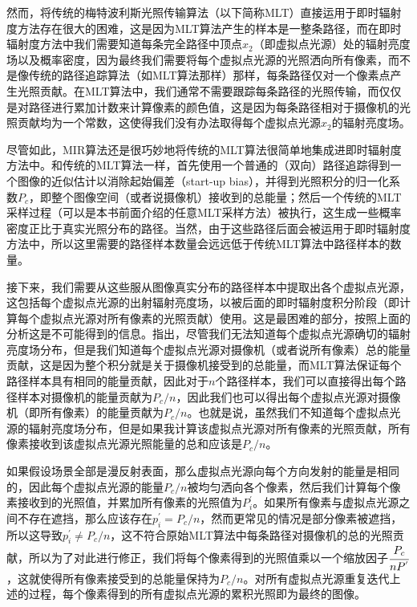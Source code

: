 然而，将传统的梅特波利斯光照传输算法（以下简称MLT）直接运用于即时辐射度方法存在很大的困难，这是因为MLT算法产生的样本是一整条路径，而在即时辐射度方法中我们需要知道每条完全路径中顶点$x_2$（即虚拟点光源）处的辐射亮度场以及概率密度，因为最终我们需要将每个虚拟点光源的光照洒向所有像素，而不是像传统的路径追踪算法（如MLT算法那样）那样，每条路径仅对一个像素点产生光照贡献。在MLT算法中，我们通常不需要跟踪每条路径的光照传输，而仅仅是对路径进行累加计数来计算像素的颜色值，这是因为每条路径相对于摄像机的光照贡献均为一个常数，这使得我们没有办法取得每个虚拟点光源$x_2$的辐射亮度场。

尽管如此，MIR算法还是很巧妙地将传统的MLT算法很简单地集成进即时辐射度方法中。和传统的MLT算法一样，首先使用一个普通的（双向）路径追踪得到一个图像的近似估计以消除起始偏差（start-up bias），并得到光照积分的归一化系数$P_c$，即整个图像空间（或者说摄像机）接收到的总能量；然后一个传统的MLT采样过程（可以是本书前面介绍的任意MLT采样方法）被执行，这生成一些概率密度正比于真实光照分布的路径。当然，由于这些路径后面会被运用于即时辐射度方法中，所以这里需要的路径样本数量会远远低于传统MLT算法中路径样本的数量。

接下来，我们需要从这些服从图像真实分布的路径样本中提取出各个虚拟点光源，这包括每个虚拟点光源的出射辐射亮度场，以被后面的即时辐射度积分阶段（即计算每个虚拟点光源对所有像素的光照贡献）使用。这是最困难的部分，按照上面的分析这是不可能得到的信息。\cite{a:BidirectionalInstantRadiosity}指出，尽管我们无法知道每个虚拟点光源确切的辐射亮度场分布，但是我们知道每个虚拟点光源对摄像机（或者说所有像素）总的能量贡献，这是因为整个积分就是关于摄像机接受到的总能量，而MLT算法保证每个路径样本具有相同的能量贡献，因此对于$n$个路径样本，我们可以直接得出每个路径样本对摄像机的能量贡献为$P_c/n$，因此我们也可以得出每个虚拟点光源对摄像机（即所有像素）的能量贡献为$P_c/n$。也就是说，虽然我们不知道每个虚拟点光源的辐射亮度场分布，但是如果我计算该虚拟点光源对所有像素的光照贡献，所有像素接收到该虚拟点光源光照能量的总和应该是$P_c/n$。

如果假设场景全部是漫反射表面，那么虚拟点光源向每个方向发射的能量是相同的，因此每个虚拟点光源的能量$P_c/n$被均匀洒向各个像素，然后我们计算每个像素接收到的光照值，并累加所有像素的光照值为$P^{'}_i$。如果所有像素与虚拟点光源之间不存在遮挡，那么应该存在$p^{'}_i=P_c/n$，然而更常见的情况是部分像素被遮挡，所以这导致$p^{'}_i\neq P_c/n$，这不符合原始MLT算法中每条路径对摄像机的总的光照贡献，所以为了对此进行修正，我们将每个像素得到的光照值乘以一个缩放因子$ \cfrac{P_c}{nP^{'}}$，这就使得所有像素接受到的总能量保持为$P_c/n$。对所有虚拟点光源重复迭代上述的过程，每个像素得到的所有虚拟点光源的累积光照即为最终的图像。

